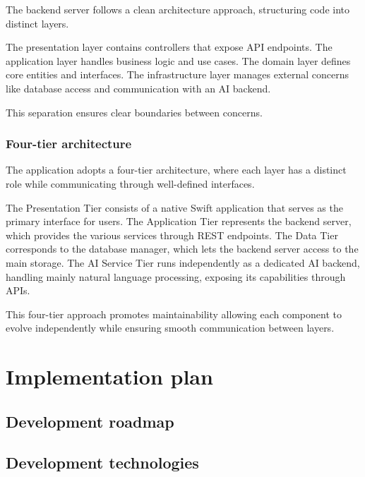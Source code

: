 \documentclass{article}
\begin{document}
The backend server follows a clean architecture approach, structuring code into distinct layers.

The presentation layer contains controllers that expose API endpoints.
The application layer handles business logic and use cases.
The domain layer defines core entities and interfaces.
The infrastructure layer manages external concerns like database access and communication with an AI backend.

This separation ensures clear boundaries between concerns.

\subsubsection{Four-tier architecture}

The application adopts a four-tier architecture, where each layer has a distinct role while communicating through well-defined interfaces.

The Presentation Tier consists of a native Swift application that serves as the primary interface for users.
The Application Tier represents the backend server, which provides the various services through REST endpoints.
The Data Tier corresponds to the database manager, which lets the backend server access to the main storage.
The AI Service Tier runs independently as a dedicated AI backend, handling mainly natural language processing, exposing its capabilities through APIs.

This four-tier approach promotes maintainability allowing each component to evolve independently while ensuring smooth communication between layers.

\section{Implementation plan}

\subsection{Development roadmap}


\subsection{Development technologies}

\end{document}
